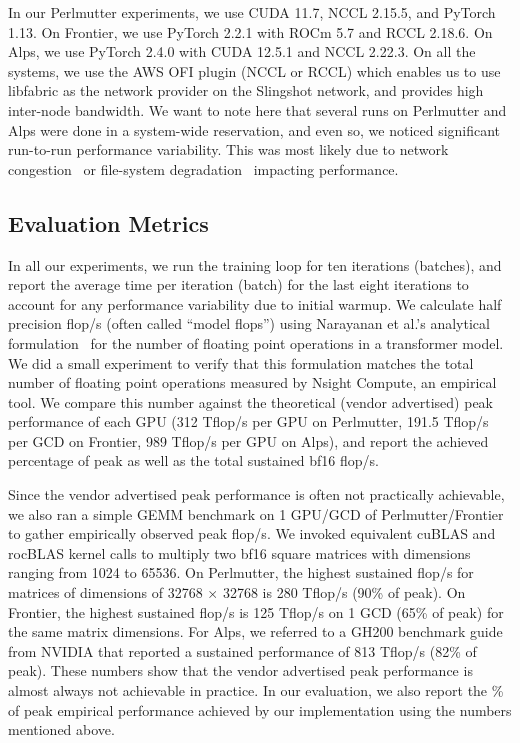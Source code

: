 In our Perlmutter experiments, we use CUDA 11.7, NCCL 2.15.5, and PyTorch 1.13. 
On Frontier, we use PyTorch 2.2.1 with ROCm 5.7 and RCCL 2.18.6.  On Alps, we
use PyTorch 2.4.0 with CUDA 12.5.1 and NCCL 2.22.3. On all the systems, we use
the AWS OFI plugin (NCCL or RCCL) which enables us to use libfabric as the
network provider on the Slingshot network, and provides high inter-node
bandwidth.  We want to note here that several runs on Perlmutter and Alps were
done in a system-wide reservation, and even so, we noticed significant
run-to-run performance variability. This was most likely due to network
congestion~\cite{bhatia:cgf2018} or file-system
degradation~\cite{mubarak:cluster2017} impacting performance.

\subsection{Evaluation Metrics}

In all our experiments, we run the training loop for ten iterations (batches),
and report the average time per iteration (batch) for the last eight iterations
to account for any performance variability due to initial warmup. We calculate
half precision flop/s (often called ``model flops'') using Narayanan et al.'s
analytical formulation~\cite{megatronlm-2} for the number of floating point
operations in a transformer model. We did a small experiment to verify that
this formulation matches the total number of floating point operations measured
by Nsight Compute, an empirical tool. We compare this number against the
theoretical (vendor advertised) peak performance of each GPU (312 Tflop/s per
GPU on Perlmutter, 191.5 Tflop/s per GCD on Frontier, 989 Tflop/s per GPU on
Alps), and report the achieved percentage of peak as well as the total
sustained bf16 flop/s.

Since the vendor advertised peak performance is often not practically
achievable, we also ran a simple GEMM benchmark on 1 GPU/GCD of
Perlmutter/Frontier to gather empirically observed peak flop/s.  We invoked
equivalent cuBLAS and rocBLAS kernel calls to multiply two bf16 square matrices
with dimensions ranging from 1024 to 65536.
On Perlmutter, the highest sustained flop/s for matrices of dimensions of 32768
$\times$ 32768 is 280 Tflop/s (90\% of peak). On Frontier, the highest
sustained flop/s is 125 Tflop/s on 1 GCD (65\% of peak) for the same matrix
dimensions. For Alps, we referred to a GH200 benchmark guide from NVIDIA that
reported a sustained performance of 813 Tflop/s (82\% of peak).  These numbers
show that the vendor advertised peak performance is almost always not
achievable in practice.  In our evaluation, we also report the \% of peak
empirical performance achieved by our implementation using the numbers
mentioned above.

